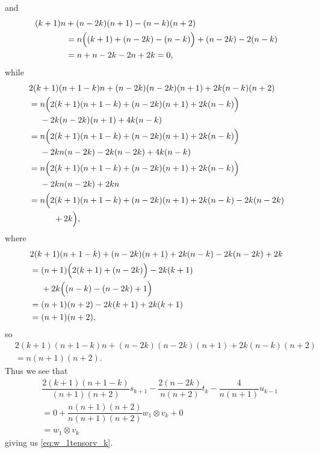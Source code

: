 and
\begin{align*}
  (k+1)n&+(n-2k)(n+1)-(n-k)(n+2) \\
        &= n\Bigl( (k+1)+(n-2k) - (n-k) \Bigr) + (n-2k) - 2(n-k)\\
  &= n + n-2k -2n+2k = 0,
\end{align*}
while
\begin{align*}
  &2(k+1)(n+1-k)n + (n-2k)(n-2k)(n+1)+2k(n-k)(n+2) \\
  &= n\Bigl( 2(k+1)(n+1-k) + (n-2k)(n+1) + 2k(n-k) \Bigr) \\*
  &\phantom{{}={}}{} - 2k(n-2k)(n+1) + 4k(n-k) \\
  &= n\Bigl( 2(k+1)(n+1-k) + (n-2k)(n+1) + 2k(n-k) \Bigr) \\*
  &\phantom{{}={}}{} - 2kn(n-2k) - 2k(n-2k) + 4k(n-k) \\
  &= n\Bigl( 2(k+1)(n+1-k) + (n-2k)(n+1) + 2k(n-k) \Bigr) \\*
  &\phantom{{}={}}{} - 2kn(n-2k) + 2kn \\
  &= n\Bigl( 2(k+1)(n+1-k) + (n-2k)(n+1) + 2k(n-k) - 2k(n-2k) \\*
  &\phantom{{}={}n\Bigl()}{} + 2k \Bigr),
\end{align*}
where
\begin{align*}
  &2(k+1)(n+1-k) + (n-2k)(n+1) + 2k(n-k) - 2k(n-2k) + 2k \\
  &= (n+1)\Bigl( 2(k+1) + (n-2k) \Bigr) - 2k(k+1) \\*
  &\phantom{{}={}}{} + 2k\Bigl( (n-k) - (n-2k) + 1\Bigr) \\
  &= (n+1)(n+2) - 2k(k+1) + 2k(k+1) \\
  &= (n+1)(n+2),
\end{align*}
so
\begin{align*}
  &2(k+1)(n+1-k)n + (n-2k)(n-2k)(n+1)+2k(n-k)(n+2) \\
  &= n(n+1)(n+2).
\end{align*}
Thus we see that
\begin{align*}
  &\dfrac{2(k+1)(n+1-k)}{(n+1)(n+2)}s_{k+1} - \dfrac{2(n-2k)}{n(n+2)}t_k - \dfrac{4}{n(n+1)}u_{k-1}\\
  &= 0 + \dfrac{n(n+1)(n+2)}{n(n+1)(n+2)}w_1\otimes v_k + 0 \\
  &= w_1\otimes v_k
\end{align*}
giving us \cref{eq:w_1tensorv_k}. 

